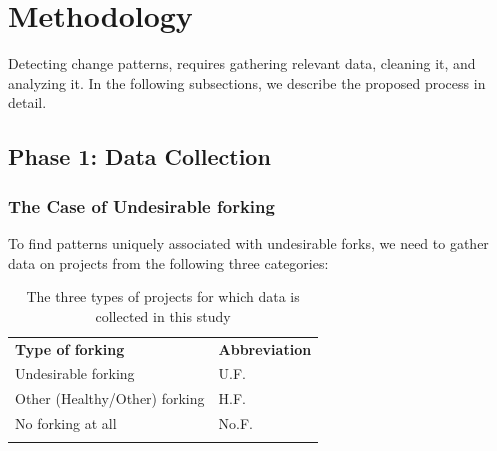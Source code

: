 \documentclass[11pt]{report}
\begin{document}
\pagebreak

\section{Methodology}
\label{methodology}

Detecting change patterns, requires gathering  relevant data, cleaning it, and analyzing it. In the following subsections, we describe the proposed process in detail. 

\subsection{Phase 1: Data Collection}
\label{DataCollection}

\subsubsection{The Case of Undesirable forking}
To find patterns uniquely associated with undesirable forks, we need to gather data on projects from the following three categories: 

\begin{table} [H]
\caption[Undesirable forking vs. Other categories]{The three types of projects for which data is collected in this study}
\label{tableUndesirableForkingDataCollect} 
\begin{tabular}{p{} p{}}
\hline\noalign{\smallskip}
\textbf{Type of forking} & \textbf{Abbreviation} \\
\noalign{\smallskip}\hline\noalign{\smallskip}
Undesirable forking & U.F. \\ \hline
Other (Healthy/Other) forking & H.F. \\\hline
No forking at all & No.F. \\
\noalign{\smallskip}\hline
\end{tabular}
\end{table}
\end{document}
